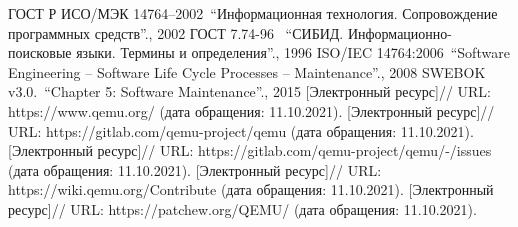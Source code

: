 
\pagebreak
\begin{thebibliography}{1}
     ГОСТ Р ИСО/МЭК 14764--2002\ \enquote{Информационная технология. Сопровождение программных средств}., 2002
     ГОСТ 7.74-96 \ \enquote{СИБИД. Информационно-поисковые языки. Термины и определения}., 1996
     ISO/IEC 14764:2006\ \enquote{Software Engineering -- Software Life Cycle Processes -- Maintenance}., 2008
     SWEBOK v3.0.\ \enquote{Chapter 5: Software Maintenance}., 2015
     [Электронный ресурс]// URL: https://www.qemu.org/ (дата обращения: 11.10.2021).
     [Электронный ресурс]// URL: https://gitlab.com/qemu-project/qemu (дата обращения: 11.10.2021).
     [Электронный ресурс]// URL: https://gitlab.com/qemu-project/qemu/-/issues (дата обращения: 11.10.2021).
     [Электронный ресурс]// URL: https://wiki.qemu.org/Contribute (дата обращения: 11.10.2021).
     [Электронный ресурс]// URL: https://patchew.org/QEMU/ (дата обращения: 11.10.2021).
\end{thebibliography}

